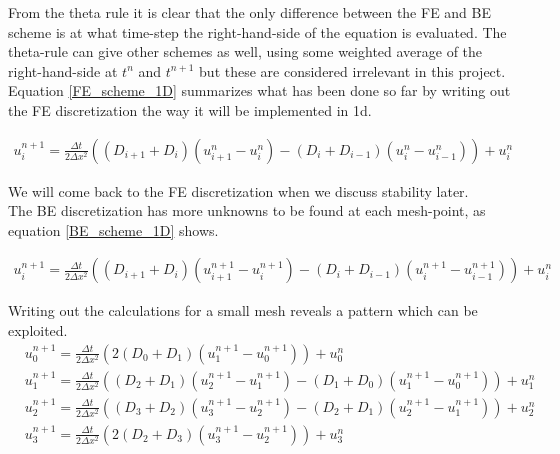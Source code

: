 From the theta rule it is clear that the only difference between the FE and BE scheme is at what time-step the right-hand-side of the equation is evaluated. 
The theta-rule can give other schemes as well, using some weighted average of the right-hand-side at $t^n$ and $t^{n+1}$ but these are considered irrelevant in this project. 
Equation \ref{FE_scheme_1D} summarizes what has been done so far by writing out the FE discretization the way it will be implemented in 1d.

\begin{align}\label{FE_scheme_1D}
 u^{n+1}_i = \frac{\Delta t}{2\Delta x^2}\left((D_{i+1}+D_{i})(u^n_{i+1}-u^n_{i})-(D_{i}+D_{i-1})(u^n_{i}-u^n_{i-1})\right) + u^n_i
\end{align}

We will come back to the FE discretization when we discuss stability later. \\
The BE discretization has more unknowns to be found at each mesh-point, as equation \ref{BE_scheme_1D} shows.

\begin{align}\label{BE_scheme_1D}
 u^{n+1}_i = \frac{\Delta t}{2\Delta x^2}\left((D_{i+1}+D_{i})(u^{n+1}_{i+1}-u^{n+1}_{i})-(D_{i}+D_{i-1})(u^{n+1}_{i}-u^{n+1}_{i-1})\right) + u^n_i
\end{align}

Writing out the calculations for a small mesh reveals a pattern which can be exploited.
\begin{align*}
 &u^{n+1}_0 =  \frac{\Delta t}{2\Delta x^2}\left(2(D_{0}+D_{1})(u^{n+1}_{1}-u^{n+1}_{0})\right) + u^n_0\\
 &u^{n+1}_1 = \frac{\Delta t}{2\Delta x^2}\left((D_{2}+D_{1})(u^{n+1}_{2}-u^{n+1}_{1})-(D_{1}+D_{0})(u^{n+1}_{1}-u^{n+1}_{0})\right) + u^n_1\\
 &u^{n+1}_2 = \frac{\Delta t}{2\Delta x^2}\left((D_{3}+D_{2})(u^{n+1}_{3}-u^{n+1}_{2})-(D_{2}+D_{1})(u^{n+1}_{2}-u^{n+1}_{1})\right) + u^n_2 \\
 &u^{n+1}_3 =  \frac{\Delta t}{2\Delta x^2}\left(2(D_{2}+D_{3})(u^{n+1}_{3}-u^{n+1}_{2})\right) + u^n_3
\end{align*}

